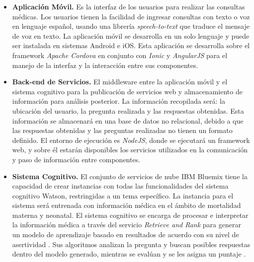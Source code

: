 \documentclass[12pt]{article}
\begin{document}


\begin{itemize}
\item \textbf{Aplicación Móvil.} Es la interfaz de los usuarios para realizar las consultas médicas. Los usuarios tienen la facilidad de ingresar consultas con texto o voz en lenguaje español, usando una librería \emph{speech-to-text} que traduce el mensaje de voz en texto. La aplicación móvil se desarrolla en un solo lenguaje y puede ser instalada en sistemas Android e iOS. Esta aplicación se desarrolla sobre el framework \emph{Apache Cordova} en conjunto con \emph{Ionic} y \emph{AngularJS} para el manejo de la interfaz y la interacción entre sus componentes.\\

\item \textbf{Back-end de Servicios.} El middleware entre la aplicación móvil y el sistema cognitivo para la publicación de servicios web y almacenamiento de información para análisis posterior. La información recopilada será: la ubicación del usuario, la pregunta realizada y las respuestas obtenidas. Esta información se almacenará en una base de datos no relacional, debido a que las respuestas obtenidas y las preguntas realizadas no tienen un formato definido. El entorno de ejecución es \emph{NodeJS}, donde se ejecutará un framework web, y sobre él estarán disponibles los servicios utilizados en la comunicación y paso de información entre componentes.\\

\item \textbf{Sistema Cognitivo.} El conjunto de servicios de nube IBM Bluemix tiene la capacidad de crear instancias con todas las funcionalidades del sistema cognitivo Watson, restringidas a un tema específico. La instancia para el sistema será entrenada con información médica en el ámbito de mortalidad materna y neonatal. El sistema cognitivo se encarga de procesar e interpretar la información médica a través del servicio \emph{Retrieve and Rank} para generar un modelo de aprendizaje basado en resultados de acuerdo con su nivel de asertividad \cite{ibm2015}. Sus algoritmos analizan la pregunta y buscan posibles respuestas dentro del modelo generado, mientras se evalúan y se les asigna un puntaje \cite{ibm2013}.

\end{itemize}
\end{document}
